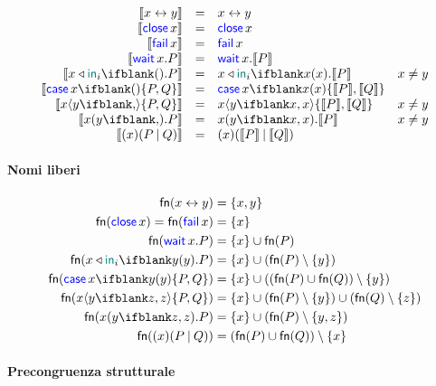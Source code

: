 \documentclass[a4paper]{article}
\begin{document}
\[
    \begin{array}[t]{rcll}
        \sem{\Link\x\y} & = & \Link\x\y \\
        \sem{\Close\x} & = & \Close\x \\
        \sem{\Fail\x} & = & \Fail\x \\
        \sem{\Wait\x.P} & = & \Wait\x.\sem{P} \\
        \sem{\Select\x{\InTag_i}{}.P} & = & \Select\x{\InTag_i}\x.\sem{P} & x \ne y \\
        \sem{\Case\x{}{P}{Q}} & = & \Case\x\x{\sem{P}}{\sem{Q}} \\
        \sem{\Fork\x\y{}{P}{Q}} & = & \Fork\x\y\x{\sem{P}}{\sem{Q}} & x \ne y \\
        \sem{\Join\x\y{}.P} & = & \Join\x\y\x.\sem{P} & x \ne y \\
        \sem{\Cut\x{P}{Q}} & = & \Cut\x{\sem{P}}{\sem{Q}} \\
    \end{array}
\]

\paragraph{Nomi liberi}

\begin{align*}
    \fn{\Link\x\y} & = \set{x,y} \\
    \fn{\Close\x} = \fn{\Fail\x} & = \set\x \\
    \fn{\Wait\x.P} & = \set\x \cup \fn{P} \\
    \fn{\Select\x{\InTag_i}\y.P} & = \set\x \cup (\fn{P} \setminus \set\y) \\
    \fn{\Case\x\y{P}{Q}} & = \set\x \cup ((\fn{P} \cup \fn{Q}) \setminus \set\y) \\
    \fn{\Fork\x\y\z{P}{Q}} & = \set\x \cup (\fn{P} \setminus \set\y) \cup (\fn{Q} \setminus \set\z) \\
    \fn{\Join\x\y\z.P} & = \set\x \cup (\fn{P} \setminus \set{y,z}) \\
    \fn{\Cut\x{P}{Q}} & = (\fn{P} \cup \fn{Q}) \setminus \set\x \\
\end{align*}

\paragraph{Precongruenza strutturale}
\end{document}
